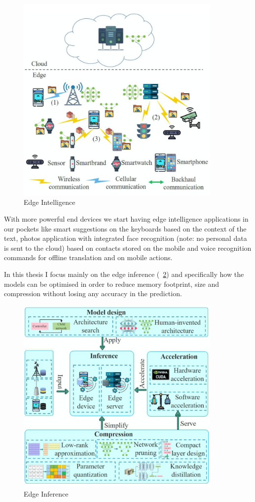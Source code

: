 \begin{figure}[ht]
    \includegraphics[width=10cm]{images/introduction/edge_intelligence.png}
    \centering
    \caption{Edge Intelligence}\label{fig:edge_intelligence}
\end{figure}

With more powerful end devices we start having edge intelligence applications
in our pockets like smart suggestions on the keyboards based on the context of
the text, photos application with integrated face recognition (note: no
personal data is sent to the cloud) based on contacts stored on the mobile and
voice recognition commands for offline translation and on mobile actions.~\cite{xu:2020}

In this thesis I focus mainly on the edge inference (~\ref{fig:edge_inference})
and specifically how the models can be optimised in order to reduce memory
footprint, size and compression without losing any accuracy in the prediction.

\begin{figure}[ht]
    \includegraphics[width=10cm]{images/introduction/edge_inference.png}
    \centering
    \caption{Edge Inference}\label{fig:edge_inference}
\end{figure}

